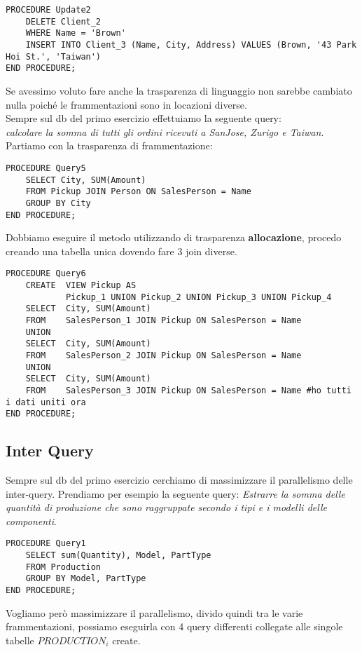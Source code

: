 \begin{lstlisting}
PROCEDURE Update2
    DELETE Client_2
    WHERE Name = 'Brown'
    INSERT INTO Client_3 (Name, City, Address) VALUES (Brown, '43 Park Hoi St.', 'Taiwan')
END PROCEDURE;
\end{lstlisting}
Se avessimo voluto fare anche la trasparenza di linguaggio non sarebbe cambiato nulla poiché le frammentazioni sono in locazioni diverse.\\

Sempre sul db del primo esercizio effettuiamo la seguente query:\\ 
\textit{calcolare la somma di tutti gli ordini ricevuti a SanJose, Zurigo e Taiwan}.\\ Partiamo con la trasparenza di frammentazione:
\begin{lstlisting}
PROCEDURE Query5
    SELECT City, SUM(Amount)
    FROM Pickup JOIN Person ON SalesPerson = Name
    GROUP BY City
END PROCEDURE;
\end{lstlisting}

Dobbiamo eseguire il metodo utilizzando di trasparenza \textbf{allocazione}, procedo creando una tabella unica dovendo fare 3 join diverse.
\begin{lstlisting}
PROCEDURE Query6 
    CREATE  VIEW Pickup AS
            Pickup_1 UNION Pickup_2 UNION Pickup_3 UNION Pickup_4
    SELECT  City, SUM(Amount)
    FROM    SalesPerson_1 JOIN Pickup ON SalesPerson = Name
    UNION
    SELECT  City, SUM(Amount)
    FROM    SalesPerson_2 JOIN Pickup ON SalesPerson = Name
    UNION
    SELECT  City, SUM(Amount)
    FROM    SalesPerson_3 JOIN Pickup ON SalesPerson = Name #ho tutti i dati uniti ora
END PROCEDURE;
\end{lstlisting}

\subsection{Inter Query}
Sempre sul db del primo esercizio cerchiamo di massimizzare il parallelismo delle inter-query. Prendiamo per esempio la seguente query: \textit{Estrarre la somma delle quantità di produzione che sono raggruppate secondo i tipi e i modelli delle componenti}.\\

\begin{lstlisting}
PROCEDURE Query1 
    SELECT sum(Quantity), Model, PartType
    FROM Production
    GROUP BY Model, PartType
END PROCEDURE;
\end{lstlisting}
Vogliamo però massimizzare il parallelismo, divido quindi tra le varie frammentazioni, possiamo eseguirla con 4 query differenti collegate alle singole tabelle $PRODUCTION_i$ create. 

